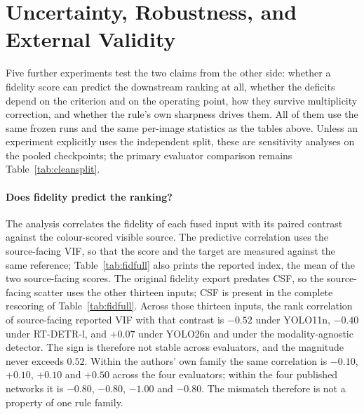 \documentclass[journal]{IEEEtran}
\begin{document}
\section{Uncertainty, Robustness, and External Validity}
\label{sec:additional}
\label{sec:extra}

\begin{sloppypar}
Five further experiments test the two claims from the other side: whether a fidelity
score can predict the downstream ranking at all, whether the deficits depend on the
criterion and on the operating point, how they survive multiplicity correction, and
whether the rule's own sharpness drives them. All of them use the same frozen runs and
the same per-image statistics as the tables above. Unless an experiment explicitly
uses the independent split, these are sensitivity analyses on the pooled checkpoints;
the primary evaluator comparison remains Table~\ref{tab:cleansplit}.

\paragraph{Does fidelity predict the ranking?} The analysis correlates the fidelity of
each fused input with its paired contrast against the colour-scored visible
source. The predictive correlation uses the source-facing VIF, so that the score and the
target are measured against the same reference; Table~\ref{tab:fidfull} also prints the
reported index, the mean of the two source-facing scores. The original fidelity export
predates CSF, so the source-facing scatter uses the other thirteen inputs; CSF is present
in the complete rescoring of Table~\ref{tab:fidfull}. Across those thirteen inputs, the
rank correlation of source-facing reported VIF with that contrast is
$-0.52$ under YOLO11n, $-0.40$ under RT-DETR-l, and $+0.07$ under YOLO26n and under the
modality-agnostic detector. The sign is therefore not stable across evaluators, and the
magnitude never exceeds $0.52$. Within the authors' own family the same correlation is
$-0.10$, $+0.10$, $+0.10$ and $+0.50$ across the four evaluators; within the four
published networks it is $-0.80$, $-0.80$, $-1.00$ and $-0.80$. The mismatch therefore
is not a property of one rule family.


\end{sloppypar}
\end{document}
